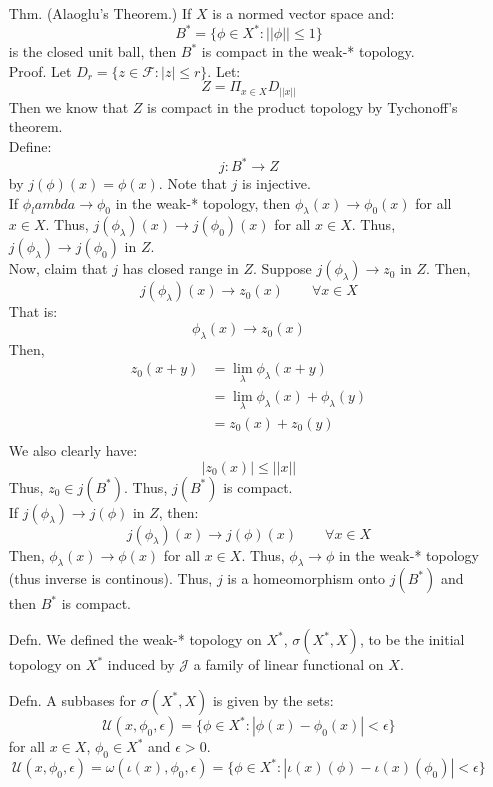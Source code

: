 \documentclass[12pt]{article}
\begin{document}
\begin{itemize}
    \item[Thm.] (Alaoglu's Theorem.) If $X$ is a normed vector space and:
    \[ B^* = \{\phi \in X^*: ||\phi|| \leq 1\}\]
    is the closed unit ball, then $B^*$ is compact in the weak-* topology. \\
    Proof. Let $D_r = \{z \in \mathcal F: |z| \leq r\}$. Let: 
    \[ Z = \Pi_{x \in X} D_{||x||}\]
    Then we know that $Z$ is compact in the product topology by Tychonoff's theorem. \\
    Define: 
    \[ j: B^* \to Z \]
    by $j(\phi)(x) = \phi(x)$. Note that $j$ is injective. \\
    If $\phi_lambda \to \phi_0$ in the weak-* topology, then $\phi_\lambda(x) \to \phi_0(x)$ for all $x \in X$. Thus, $j(\phi_\lambda)(x) \to j(\phi_0)(x)$ for all $x \in X$. Thus, $j(\phi_\lambda) \to j(\phi_0)$ in $Z$. \\
    Now, claim that $j$ has closed range in $Z$. Suppose $j(\phi_\lambda) \to z_0$ in $Z$. Then, 
    \[ j(\phi_\lambda)(x) \to z_0(x) \qquad \forall x \in X \]
    That is:
    \[ \phi_\lambda(x) \to z_0(x) \]
    Then,
    \begin{align*}
        z_0(x+y) &= \lim_\lambda \phi_\lambda(x+y)  \\
        &= \lim_\lambda \phi_\lambda(x) + \phi_\lambda(y) \\
        &= z_0(x) + z_0(y) \\
    \end{align*}
    We also clearly have: 
    \[ |z_0(x)| \leq ||x|| \]
    Thus, $z_0 \in j(B^*)$. Thus, $j(B^*)$ is compact. \\
    If $j(\phi_\lambda) \to j(\phi)$ in $Z$, then:
    \[ j(\phi_\lambda)(x) \to j(\phi)(x) \qquad \forall x \in X\] 
    Then, $\phi_\lambda(x) \to \phi(x)$ for all $x \in X$. Thus, $\phi_\lambda \to \phi$ in the weak-* topology (thus inverse is continous).
    Thus, $j$ is a homeomorphism onto $j(B^*)$ and then $B^*$ is compact. 
    \newpage
    \item[Defn.] We defined the weak-* topology on $X^*$, $\sigma(X^*, X)$, to be the initial topology on $X^*$ induced by $\mathcal{J}$ a family of linear functional on $X$. 
    \item[Defn.] A subbases for $\sigma(X^*, X)$ is given by the sets: 
    \[ \mathcal{U}(x, \phi_0, \epsilon) = \{\phi \in X^* : |\phi(x) - \phi_0(x)| < \epsilon\}\]
    for all $x \in X$, $\phi_0 \in X^*$ and $\epsilon > 0$.
    \[ \mathcal{U}(x, \phi_0, \epsilon) = \omega(\iota(x), \phi_0, \epsilon) = \{ \phi \in X^* : | \iota(x)(\phi)-\iota(x)(\phi_0)| < \epsilon\}\]

\end{itemize}
\end{document}
